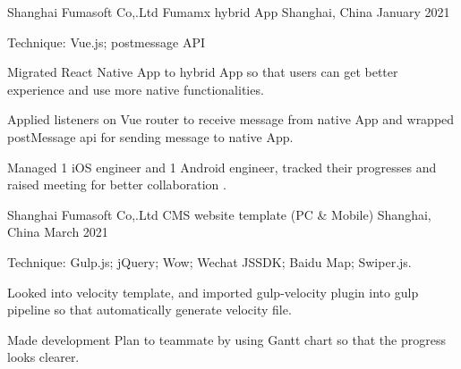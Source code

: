 

\begin{cventries}

  \cventry
    {Shanghai Fumasoft Co,.Ltd} %
    {Fumamx hybrid App} %
    {Shanghai, China} %
    {January 2021} %
    {
      \begin{cvitems} %
        \item {Technique: Vue.js; postmessage API}
        \item {Migrated React Native App to hybrid App so that users can get better experience and use more native functionalities.}
        \item {Applied listeners on Vue router to receive message from native App and wrapped postMessage api for sending message to native App.}
        \item {Managed 1 iOS engineer and 1 Android engineer, tracked their progresses and raised meeting for better collaboration .}
      \end{cvitems}
    }


    \cventry
    {Shanghai Fumasoft Co,.Ltd} %
    {CMS website template (PC \& Mobile)} %
    {Shanghai, China} %
    {March 2021} %
    {
      \begin{cvitems} %
        \item {Technique: Gulp.js; jQuery; Wow; Wechat JSSDK; Baidu Map; Swiper.js.}
        \item {Looked into velocity template, and imported gulp-velocity plugin into gulp pipeline so that automatically generate velocity file.}
        \item {Made development Plan to teammate by using Gantt chart so that the progress looks clearer.}
      \end{cvitems}
    }


\end{cventries}
